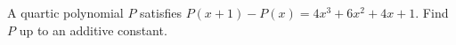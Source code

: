 A quartic polynomial $P$ satisfies $P(x+1)-P(x)=4x^3+6x^2+4x+1$. Find $P$ up to an additive constant.
